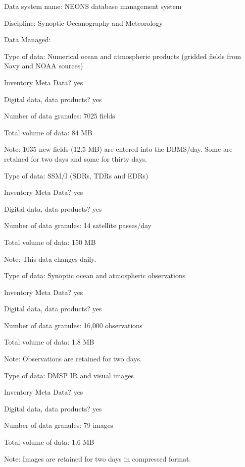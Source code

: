 \begin{description}

\item{Data system name:}  NEONS database management system
\item{Discipline:}  Synoptic Oceanography and Meteorology
\item{Data Managed:}
	\begin{description}
	\item{Type of data:}  Numerical ocean and atmospheric products 
(gridded fields from Navy and NOAA sources)
	\item{Inventory Meta Data?}  yes
	\item{Digital data, data products?}  yes
	\item{Number of data granules:}  7025 fields
	\item{Total volume of data:}  84 MB
	\item{Note:} 1035 new fields (12.5 MB) are entered into the 
DBMS/day.  Some are retained for two days and some for thirty days.
\medskip
	\item{Type of data:}  SSM/I (SDRs, TDRs and EDRs)
	\item{Inventory Meta Data?}  yes
	\item{Digital data, data products?}  yes
	\item{Number of data granules:}  14 satellite passes/day
	\item{Total volume of data:}  150 MB
	\item{Note:}  This data changes daily.
\medskip
	\item{Type of data:}  Synoptic ocean and atmospheric observations
	\item{Inventory Meta Data?}  yes
	\item{Digital data, data products?}  yes
	\item{Number of data granules:}  16,000 observations
	\item{Total volume of data:}  1.8 MB
	\item{Note:}  Observations are retained for two days.
\medskip
	\item{Type of data:}  DMSP IR and visual images
	\item{Inventory Meta Data?}  yes
	\item{Digital data, data products?}  yes
	\item{Number of data granules:}  79 images
	\item{Total volume of data:}  1.6 MB
	\item{Note:}  Images are retained for two days in compressed 
format.
	\end{description}
\end{description}

